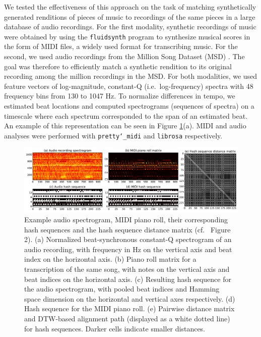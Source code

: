 \documentclass{article} %
\begin{document}
We tested the effectiveness of this approach on the task of matching synthetically generated renditions of pieces of music to recordings of the same pieces in a large database of audio recordings.
For the first modality, synthetic recordings of music were obtained by using the \texttt{fluidsynth} program to synthesize musical scores in the form of MIDI files, a widely used format for transcribing music.
For the second, we used audio recordings from the Million Song Dataset (MSD) \cite{bertin2011million,schindler2012facilitating}.
The goal was therefore to efficiently match a synthetic rendition to its original recording among the million recordings in the MSD.
For both modalities, we used feature vectors of log-magnitude, constant-Q (i.e.\ log-frequency) spectra with 48 frequency bins from 130 to 1047 Hz. 
To normalize differences in tempo, we estimated beat locations and computed spectrograms (sequences of spectra) on a timescale where each spectrum corresponded to the span of an estimated beat.
An example of this representation can be seen in Figure \ref{fig:sims_and_dtws}(a).
MIDI and audio analyses were performed with \texttt{pretty\char`_midi} \cite{raffel2014pretty_midi} and \texttt{librosa} \cite{mcfee2015librosa,mcfee2015librosa_scipy} respectively. 

\begin{figure}
  \centering
  \includegraphics[width=\textwidth]{sims_and_dtws.pdf}
  \caption{Example audio spectrogram, MIDI piano roll, their corresponding hash sequences and the hash sequence distance matrix (cf.\ \cite{raffel2015large} Figure 2).
       (a) Normalized beat-synchronous constant-Q spectrogram of an audio recording, with frequency in Hz on the vertical axis and beat index on the horizontal axis.
	   (b) Piano roll matrix for a transcription of the same song, with notes on the vertical axis and beat indices on the horizontal axis.
	   (c) Resulting hash sequence for the audio spectrogram, with pooled beat indices and Hamming space dimension on the horizontal and vertical axes respectively.
	   (d) Hash sequence for the MIDI piano roll.
	   (e) Pairwise distance matrix and DTW-based alignment path (displayed as a white dotted line) for hash sequences.  Darker cells indicate smaller distances.}
  \label{fig:sims_and_dtws}
\end{figure}
\end{document}

